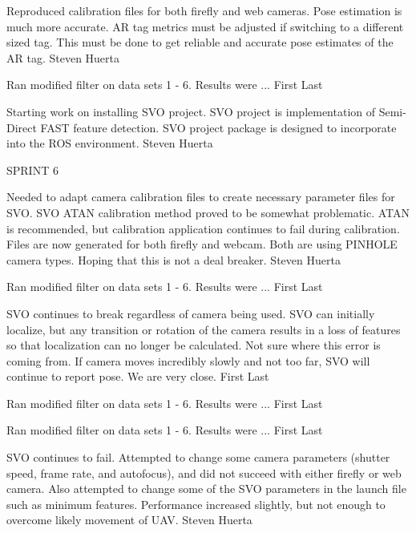 \begin{description}
\item [2/22/16]  Reproduced calibration files for both firefly and web cameras. Pose estimation is much more accurate. AR tag metrics must be adjusted if switching to a different sized tag. This must be done to get reliable and accurate pose estimates of the AR tag. \hfill{Steven Huerta}

\item [2/29/16]  Ran modified filter on data sets 1 - 6.  Results were ... \hfill{First Last}

\item [2/29/16]  Starting work on installing SVO project. SVO project is implementation of Semi-Direct FAST feature detection. SVO project package is designed to incorporate into the ROS environment. \hfill{Steven Huerta}

\item SPRINT 6
\item [3/21/16]  Needed to adapt camera calibration files to create necessary parameter files for SVO. SVO ATAN calibration method proved to be somewhat problematic. ATAN is recommended, but calibration application continues to fail during calibration. Files are now generated for both firefly and webcam. Both are using PINHOLE camera types. Hoping that this is not a deal breaker.  \hfill{Steven Huerta}

\item [3/21/16]  Ran modified filter on data sets 1 - 6.  Results were ... \hfill{First Last}

\item [3/28/16]  SVO continues to break regardless of camera being used. SVO can initially localize, but any transition or rotation of the camera results in a loss of features so that localization can no longer be calculated. Not sure where this error is coming from. If camera moves incredibly slowly and not too far, SVO will continue to report pose. We are very close.  \hfill{First Last}

\item [3/28/16]  Ran modified filter on data sets 1 - 6.  Results were ... \hfill{First Last}

\item [4/4/16]  Ran modified filter on data sets 1 - 6.  Results were ... \hfill{First Last}

\item [4/4/16] SVO continues to fail. Attempted to change some camera parameters (shutter speed, frame rate, and autofocus), and did not succeed with either firefly or web camera. Also attempted to change some of the SVO parameters in the launch file such as minimum features. Performance increased slightly, but not enough to overcome likely movement of UAV.  \hfill{Steven Huerta}
\end{description}